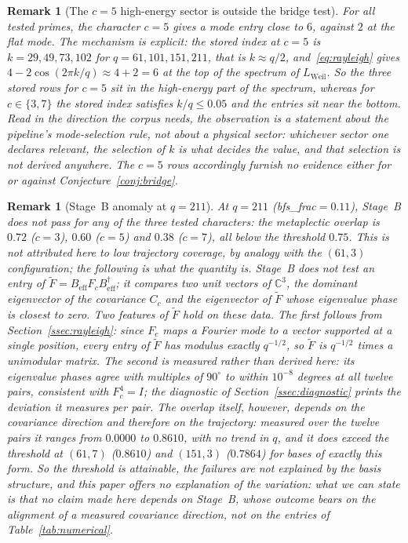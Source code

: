 \documentclass[11pt,a4paper]{article}
\newtheorem{remark}[theorem]{Remark}
\begin{document}
    \begin{remark}[The $c=5$ high-energy sector is outside the bridge test]
      \label{rem:c5}
      For all tested primes, the character $c=5$ gives a mode entry close to $6$, against $2$ at
      the flat mode.
      The mechanism is explicit: the stored index at $c=5$ is $k = 29, 49, 73, 102$ for
      $q = 61, 101, 151, 211$, that is $k \approx q/2$, and~\eqref{eq:rayleigh} gives
      $4 - 2\cos(2\pi k/q) \approx 4 + 2 = 6$ at the top of the spectrum of
      $L_{\mathrm{Weil}}$.
      So the three stored rows for $c=5$ sit in the high-energy part of the spectrum, whereas for
      $c \in \{3,7\}$ the stored index satisfies $k/q \le 0.05$ and the entries sit near the
      bottom.
      Read in the direction the corpus needs, the observation is a statement about the pipeline's
      mode-selection rule, not about a physical sector: whichever sector one declares relevant,
      the selection of $k$ is what decides the value, and that selection is not derived anywhere.
      The $c = 5$ rows accordingly furnish no evidence either for or against
      Conjecture~\ref{conj:bridge}.
    \end{remark}

    \begin{remark}[Stage~B anomaly at $q=211$]
      \label{rem:q211}
      At $q=211$ (bfs\_frac$=0.11$), Stage~B does not pass for any of the three tested
      characters: the metaplectic overlap is $0.72$ ($c=3$), $0.60$ ($c=5$) and $0.38$ ($c=7$),
      all below the threshold $0.75$.
      This is not attributed here to low trajectory coverage, by analogy with the $(61,3)$
      configuration; the following is what the quantity is.
      Stage~B does not test an entry of $\tilde F = B_{\mathrm{eff}} F_c B_{\mathrm{eff}}^\dagger$;
      it compares two unit vectors of $\mathbb{C}^3$, the dominant eigenvector of the covariance
      $C_c$ and the eigenvector of $\tilde F$ whose eigenvalue phase is closest to zero.
      Two features of $\tilde F$ hold on these data.
      The first follows from Section~\ref{ssec:rayleigh}: since $F_c$ maps a Fourier mode to a
      vector supported at a single position, every entry of $\tilde F$ has modulus exactly
      $q^{-1/2}$, so $\tilde F$ is $q^{-1/2}$ times a unimodular matrix.
      The second is measured rather than derived here: its eigenvalue phases agree with multiples of
      $90^\circ$ to within $10^{-8}$ degrees at all twelve pairs, consistent with $F_c^4 = I$; the
      diagnostic of Section~\ref{ssec:diagnostic} prints the deviation it measures per pair.
      The overlap itself, however, depends on the covariance direction and therefore on the
      trajectory: measured over the twelve pairs it ranges from $0.0000$ to $0.8610$, with no
      trend in $q$, and it does exceed the threshold at $(61,7)$ ($0.8610$) and $(151,3)$
      ($0.7864$) for bases of exactly this form.
      So the threshold is attainable, the failures are not explained by the basis structure, and
      this paper offers no explanation of the variation: what we can state is that no claim made
      here depends on Stage~B, whose outcome bears on the alignment of a measured covariance
      direction, not on the entries of Table~\ref{tab:numerical}.
    \end{remark}
\end{document}
